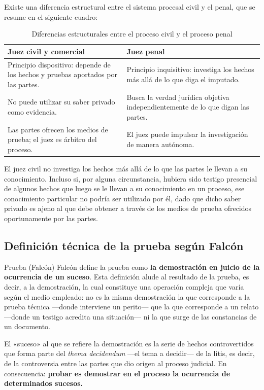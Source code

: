 \documentclass[12pt,oneside]{book}
\begin{document}
Existe una diferencia estructural entre el sistema procesal civil y el penal, que se resume en el siguiente cuadro:

\begin{table}[H]
\centering
\begin{tabularx}{\textwidth}{>{\raggedright\arraybackslash}X >{\raggedright\arraybackslash}X}
\toprule
\textbf{Juez civil y comercial} & \textbf{Juez penal} \\
\midrule
Principio dispositivo: depende de los hechos y pruebas aportados por las partes. & Principio inquisitivo: investiga los hechos más allá de lo que diga el imputado. \\
No puede utilizar su saber privado como evidencia. & Busca la verdad jurídica objetiva independientemente de lo que digan las partes. \\
Las partes ofrecen los medios de prueba; el juez es árbitro del proceso. & El juez puede impulsar la investigación de manera autónoma. \\
\bottomrule
\end{tabularx}
\caption{Diferencias estructurales entre el proceso civil y el proceso penal}
\end{table}

El juez civil no investiga los hechos más allá de lo que las partes le llevan a su conocimiento. Incluso si, por alguna circunstancia, hubiera sido testigo presencial de algunos hechos que luego se le llevan a su conocimiento en un proceso, ese conocimiento particular no podría ser utilizado por él, dado que dicho saber privado es ajeno al que debe obtener a través de los medios de prueba ofrecidos oportunamente por las partes.

\subsection{Definición técnica de la prueba según Falcón}

\begin{definition}{Prueba (Falcón)}
Falcón define la prueba como \textbf{la demostración en juicio de la ocurrencia de un suceso}. Esta definición alude al resultado de la prueba, es decir, a la demostración, la cual constituye una operación compleja que varía según el medio empleado: no es la misma demostración la que corresponde a la prueba técnica —donde interviene un perito— que la que corresponde a un relato —donde un testigo acredita una situación— ni la que surge de las constancias de un documento.

El «suceso» al que se refiere la demostración es la serie de hechos controvertidos que forma parte del \textit{thema decidendum} —el tema a decidir— de la litis, es decir, de la controversia entre las partes que dio origen al proceso judicial. En consecuencia: \textbf{probar es demostrar en el proceso la ocurrencia de determinados sucesos.}
\end{definition}
\end{document}
